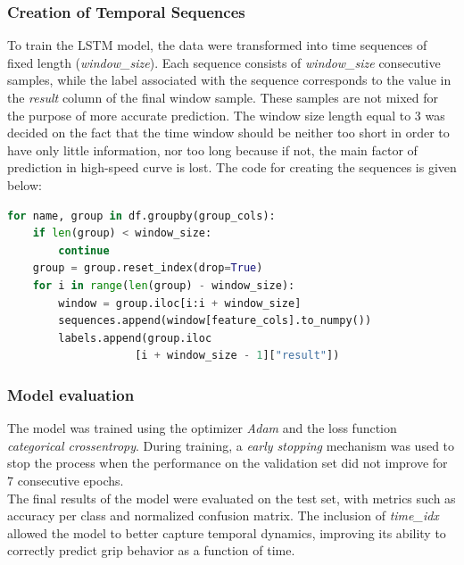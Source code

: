 \documentclass[a4paper,final,12pt]{report}
\begin{document}
\subsubsection{Creation of Temporal Sequences}
To train the LSTM model, the data were transformed into time sequences of fixed length (\textit{window\_size}). Each sequence consists of \textit{window\_size} consecutive samples, while the label associated with the sequence corresponds to the value in the \textit{result} column of the final window sample. These samples are not mixed for the purpose of more accurate prediction. The window size length equal to 3 was decided on the fact that the time window should be neither too short in order to have only little information, nor too long because if not, the main factor of prediction in high-speed curve is lost. The code for creating the sequences is given below:

\begin{lstlisting}[language=Python, caption=
Creation of time sequences]
for name, group in df.groupby(group_cols):
    if len(group) < window_size:
        continue
    group = group.reset_index(drop=True)
    for i in range(len(group) - window_size):
        window = group.iloc[i:i + window_size]
        sequences.append(window[feature_cols].to_numpy())
        labels.append(group.iloc
                    [i + window_size - 1]["result"])
\end{lstlisting}

\subsubsection{Model evaluation}
The model was trained using the optimizer \textit{Adam} and the loss function \textit{categorical crossentropy}. During training, a \textit{early stopping} mechanism was used to stop the process when the performance on the validation set did not improve for 7 consecutive epochs.\\

The final results of the model were evaluated on the test set, with metrics such as accuracy per class and normalized confusion matrix. The inclusion of \textit{time\_idx} allowed the model to better capture temporal dynamics, improving its ability to correctly predict grip behavior as a function of time.
\end{document}

